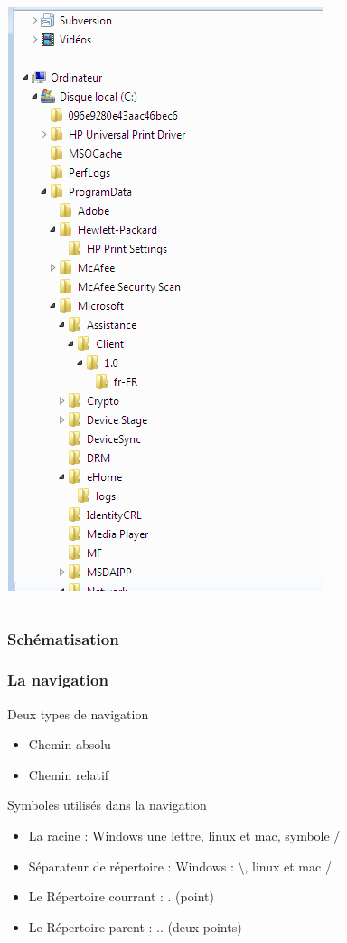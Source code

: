 \documentclass[table,svgnames,hyperref={pdfpagemode=FullScreen}]{beamer}
\begin{document}
\begin{frame}
\begin{columns}
\begin{column}[c]{5cm}
				\includegraphics[scale=0.25]{image/ArboWin.png}
			\end{column}
		\end{columns}
\end{frame}

\begin{frame}
		\frametitle{Schématisation}
		\begin{center}
			
		\end{center}
\end{frame}	

\begin{frame}
		\frametitle{La navigation}
		\begin{block}{Deux types de navigation}
			\begin{itemize}
				\item Chemin absolu
				\item Chemin relatif
			\end{itemize}
		\end{block}
		\begin{block}{Symboles utilisés dans la navigation}
			\begin{itemize}
				\item La racine : Windows une lettre, linux et mac, symbole / 
				\item Séparateur de répertoire : Windows : \textbackslash, linux et mac  /
				\item Le Répertoire courrant : . (point)
				\item Le Répertoire parent : .. (deux points)
			\end{itemize}
		\end{block}
\end{frame}
\end{document}
